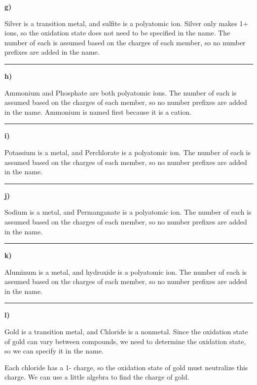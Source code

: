 \documentclass[12pt, oneside, letterpaper]{book}
\begin{document}
\textbf{g) }

Silver is a transition metal, and sulfite is a polyatomic ion. Silver only makes 1+ ions, so the oxidation state does not need to be specified in the name. The number of each is assumed based on the charges of each member, so no number prefixes are added in the name. 


\hrule

\textbf{h) }

Ammonium and Phosphate are both polyatomic ions. The number of each is assumed based on the charges of each member, so no number prefixes are added in the name. Ammonium is named first because it is a cation. 



\hrule

\textbf{i) }

Potassium is a metal, and Perchlorate is a polyatomic ion. The number of each is assumed based on the charges of each member, so no number prefixes are added in the name. 



\hrule

\textbf{j) }

Sodium is a metal, and Permanganate is a polyatomic ion. The number of each is assumed based on the charges of each member, so no number prefixes are added in the name. 



\hrule

\textbf{k) }

Aluminum is a metal, and hydroxide is a polyatomic ion. The number of each is assumed based on the charges of each member, so no number prefixes are added in the name. 



\hrule

\textbf{l) }

Gold is a transition metal, and Chloride is a nonmetal. Since the oxidation state of gold can vary between compounds, we need to determine the oxidation state, so we can specify it in the name. 

Each chloride has a 1- charge, so the oxidation state of gold must neutralize this charge. We can use a little algebra to find the charge of gold. 
\end{document}
